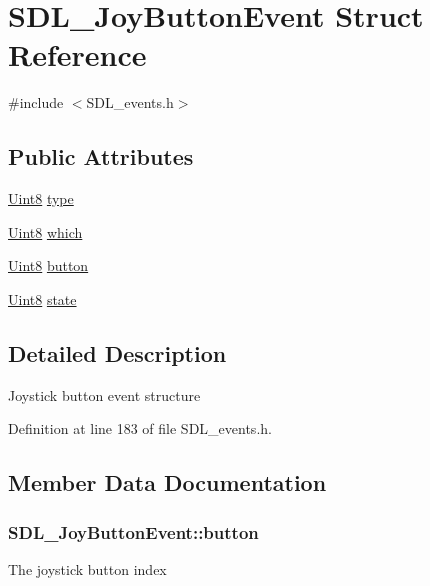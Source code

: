 \hypertarget{struct_s_d_l___joy_button_event}{}\section{S\+D\+L\+\_\+\+Joy\+Button\+Event Struct Reference}
\label{struct_s_d_l___joy_button_event}


{\ttfamily \#include $<$S\+D\+L\+\_\+events.\+h$>$}

\subsection*{Public Attributes}
\begin{DoxyCompactItemize}
\item 
\hyperlink{_s_d_l__stdinc_8h_a2944638813a090aa23e62f4da842c3e2}{Uint8} \hyperlink{struct_s_d_l___joy_button_event_a1ec5304348dc281dac6b3b70825f115e}{type}
\item 
\hyperlink{_s_d_l__stdinc_8h_a2944638813a090aa23e62f4da842c3e2}{Uint8} \hyperlink{struct_s_d_l___joy_button_event_a853258976673fceb8cd7340260b3823d}{which}
\item 
\hyperlink{_s_d_l__stdinc_8h_a2944638813a090aa23e62f4da842c3e2}{Uint8} \hyperlink{struct_s_d_l___joy_button_event_a73ebe4261cf80564052af9c1af737a4d}{button}
\item 
\hyperlink{_s_d_l__stdinc_8h_a2944638813a090aa23e62f4da842c3e2}{Uint8} \hyperlink{struct_s_d_l___joy_button_event_ad3b6f8d9aa2c5e694f664b97d12bcd2b}{state}
\end{DoxyCompactItemize}


\subsection{Detailed Description}
Joystick button event structure 

Definition at line 183 of file S\+D\+L\+\_\+events.\+h.



\subsection{Member Data Documentation}
\hypertarget{struct_s_d_l___joy_button_event_a73ebe4261cf80564052af9c1af737a4d}{}
\subsubsection[{button}]{ S\+D\+L\+\_\+\+Joy\+Button\+Event\+::button}\label{struct_s_d_l___joy_button_event_a73ebe4261cf80564052af9c1af737a4d}
The joystick button index 


